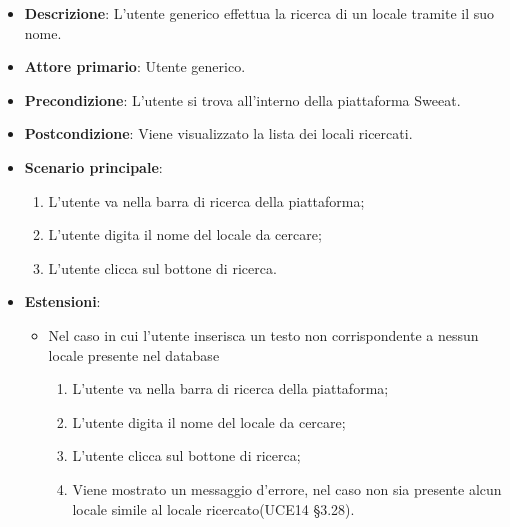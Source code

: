 \begin{itemize}
    \item \textbf{Descrizione}: L'utente generico effettua la ricerca di un locale tramite il suo nome.
    \item \textbf{Attore primario}: Utente generico.
    \item \textbf{Precondizione}: L'utente si trova all’interno della piattaforma Sweeat.
    \item \textbf{Postcondizione}: Viene visualizzato la lista dei locali ricercati.
    \item \textbf{Scenario principale}: 
    \begin{enumerate}
        \item L’utente va nella barra di ricerca della piattaforma;
        \item L’utente digita il nome del locale da cercare;
        \item L’utente clicca sul bottone di ricerca.
    \end{enumerate}
    \item \textbf{Estensioni}:
    \begin{itemize}
        \item Nel caso in cui l’utente inserisca un testo non corrispondente a nessun locale presente nel database
	\begin{enumerate}  
		\item L’utente va nella barra di ricerca della piattaforma;
        \item L’utente digita il nome del locale da cercare;
        \item L’utente clicca sul bottone di ricerca; 
        \item Viene mostrato un messaggio d'errore, nel caso non sia presente alcun locale simile al locale ricercato(UCE14 §3.28).
    \end{enumerate}
    \end{itemize}    
\end{itemize}

